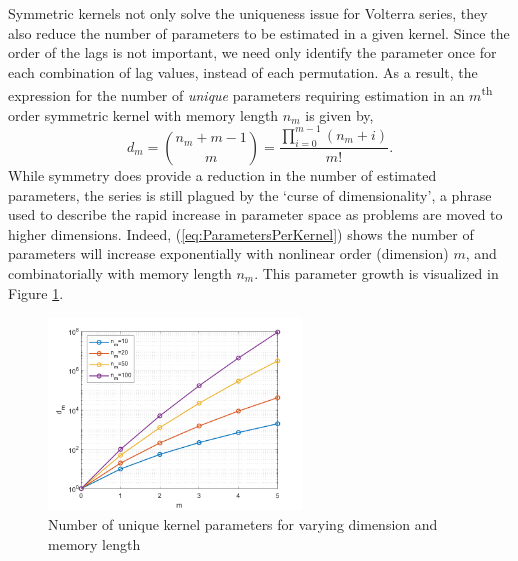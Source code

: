 Symmetric kernels not only solve the uniqueness issue for Volterra series, they also reduce the number of parameters to be estimated in a given kernel. Since the order of the lags is not important, we need only identify the parameter once for each combination of lag values, instead of each permutation. As a result, the expression for the number of \emph{unique} parameters requiring estimation in an $m$\textsuperscript{th} order symmetric kernel with memory length $n_m$ is given by,
\begin{equation} 
\label{eq:ParametersPerKernel}
d_m = \binom{n_m+m-1}{m} = \frac{\prod_{i=0}^{m-1}(n_m + i)}{m!}.
\end{equation}
While symmetry does provide a reduction in the number of estimated parameters, the series is still plagued by the `curse of dimensionality', a phrase used to describe the rapid increase in parameter space as problems are moved to higher dimensions. Indeed, (\ref{eq:ParametersPerKernel}) shows the number of parameters will increase exponentially with nonlinear order (dimension) $m$, and combinatorially with memory length $n_m$. This parameter growth is visualized in Figure \ref{fig:ParameterGrowthCurse}.

\begin{figure}[h]
\centering
\includegraphics[width=0.6\textwidth]{Chapter3_VolterraSeries/ParameterGrowth.pdf}
\caption{Number of unique kernel parameters for varying dimension and memory length}
\label{fig:ParameterGrowthCurse}
\end{figure}

